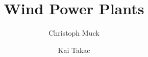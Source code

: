 




\subject{ENI IEML Seminar Paper}

\title{Wind Power Plants}
\author{Christoph Muck \and Kai Takac}


\maketitle


\tableofcontents			%

%

\clearpage
% 
\printbibliography[heading=bibintoc]



